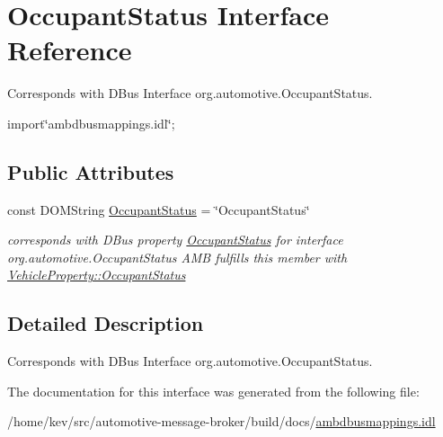 \hypertarget{interfaceOccupantStatus}{\section{Occupant\+Status Interface Reference}
\label{interfaceOccupantStatus}
}


Corresponds with D\+Bus Interface org.\+automotive.\+Occupant\+Status.  




{\ttfamily import\char`\"{}ambdbusmappings.\+idl\char`\"{};}

\subsection*{Public Attributes}
\begin{DoxyCompactItemize}
\item 
\hypertarget{interfaceOccupantStatus_acfe99b178c11dc9cdc91511914914200}{const D\+O\+M\+String \hyperlink{interfaceOccupantStatus_acfe99b178c11dc9cdc91511914914200}{Occupant\+Status} = \char`\"{}Occupant\+Status\char`\"{}}\label{interfaceOccupantStatus_acfe99b178c11dc9cdc91511914914200}

\begin{DoxyCompactList}\small\item\em corresponds with D\+Bus property \hyperlink{interfaceOccupantStatus}{Occupant\+Status} for interface org.\+automotive.\+Occupant\+Status A\+M\+B fulfills this member with \hyperlink{classVehicleProperty_a581909689c6ad9ffea21a4de61109150}{Vehicle\+Property\+::\+Occupant\+Status} \end{DoxyCompactList}\end{DoxyCompactItemize}


\subsection{Detailed Description}
Corresponds with D\+Bus Interface org.\+automotive.\+Occupant\+Status. 

The documentation for this interface was generated from the following file\+:\begin{DoxyCompactItemize}
\item 
/home/kev/src/automotive-\/message-\/broker/build/docs/\hyperlink{ambdbusmappings_8idl}{ambdbusmappings.\+idl}\end{DoxyCompactItemize}
